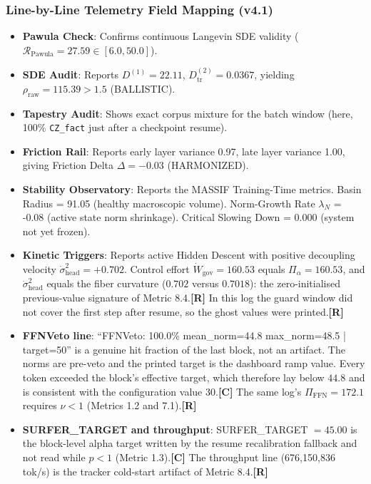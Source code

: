 \documentclass[11pt,a4paper]{article}
\newcommand{\sR}{\textbf{[R]}}
\newcommand{\sC}{\textbf{[C]}}
\begin{document}
\subsubsection*{Line-by-Line Telemetry Field Mapping (v4.1)}
\begin{itemize}[leftmargin=*]
    \item \textbf{Pawula Check}: Confirms continuous Langevin SDE validity ($\mathcal{R}_{\text{Pawula}} = 27.59 \in [6.0, 50.0]$).
    \item \textbf{SDE Audit}: Reports $D^{(1)} = 22.11$, $D^{(2)}_{\text{tr}} = 0.0367$, yielding $\rho_{\text{raw}} = 115.39 > 1.5$ (\textsf{BALLISTIC}).
    \item \textbf{Tapestry Audit}: Shows exact corpus mixture for the batch window (here, 100\% \texttt{CZ\_fact} just after a checkpoint resume).
    \item \textbf{Friction Rail}: Reports early layer variance 0.97, late layer variance 1.00, giving Friction Delta $\Delta = -0.03$ (\textsf{HARMONIZED}).
    \item \textbf{Stability Observatory}: Reports the MASSIF Training-Time metrics. Basin Radius = 91.05 (healthy macroscopic volume). Norm-Growth Rate $\lambda_N$ = -0.08 (active state norm shrinkage). Critical Slowing Down = 0.000 (system not yet frozen).
    \item \textbf{Kinetic Triggers}: Reports active Hidden Descent with positive decoupling velocity $\dot{\sigma}^2_{\text{head}} = +0.702$. Control effort $\dot{W}_{\text{gov}} = 160.53$ equals $\Pi_\alpha = 160.53$, and $\dot\sigma^2_{\text{head}}$ equals the fiber curvature ($0.702$ versus $0.7018$): the zero-initialised previous-value signature of Metric 8.4.\sR{} In this log the guard window did not cover the first step after resume, so the ghost values were printed.\sR{}
    \item \textbf{FFNVeto line}: ``FFNVeto: 100.0\% mean\_norm=44.8 max\_norm=48.5 | target=50'' is a genuine hit fraction of the last block, not an artifact. The norms are pre-veto and the printed target is the dashboard ramp value. Every token exceeded the block's effective target, which therefore lay below $44.8$ and is consistent with the configuration value $30$.\sC{} The same log's $\Pi_{\text{FFN}} = 172.1$ requires $\nu < 1$ (Metrics 1.2 and 7.1).\sR{}
    \item \textbf{SURFER\_TARGET and throughput}: SURFER\_TARGET $= 45.00$ is the block-level alpha target written by the resume recalibration fallback and not read while $p < 1$ (Metric 1.3).\sC{} The throughput line (676{,}150{,}836 tok/s) is the tracker cold-start artifact of Metric 8.4.\sR{}

\end{itemize}
\end{document}
